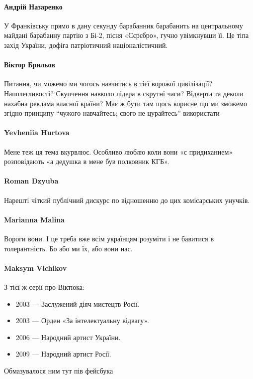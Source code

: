 \paragraph{Андрій Назаренко}
У Франківську прямо в дану секунду барабанник барабанить на центральному
майдані барабанну партію з Бі-2, пісня «Сєрєбро», гучно увімкнувши її. Це тіпа
захід України, дофіга патріотичний націоналістичний. 

\paragraph{Віктор Брильов}

Питання, чи можемо ми чогось навчитись в тієї ворожої цивілізації?
Наполегливості? Скупчення навколо лідера в скрутні часи? Відверта та деколи
нахабна реклама власної країни? Має ж бути там щось корисне що ми зможемо
згідно принципу \enquote{чужого навчайтесь; свого не цурайтесь} використати

\paragraph{Yevheniia Hurtova}
Мене теж ця тема вкурвлює. Особливо люблю коли вони «с придиханием»
розповідають «а дедушка в мене був полковник КГБ». 

\paragraph{Roman Dzyuba}
Нарешті чіткий публічний дискурс по відношенню до цих комісарських унучків.

\paragraph{Marianna Malina}
Вороги вони. І це треба вже всім українцям розуміти і не бавитися в
толерантність. Бо або ми їх, або вони нас.

\paragraph{Maksym Vichikov}

З тієї ж серії про Віктюка:
\begin{itemize}
  \item 2003 --- Заслужений діяч мистецтв Росії.
  \item 2003 --- Орден «За інтелектуальну відвагу».
  \item 2006 --- Народний артист України.
  \item 2009 --- Народний артист Росії.
\end{itemize}
Обмазувалося ним тут пів фейсбука

